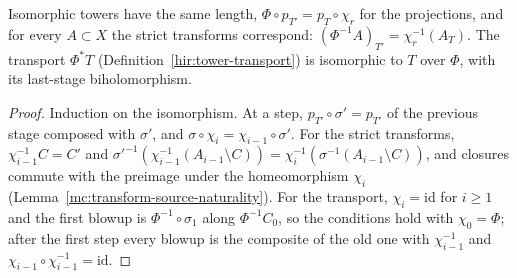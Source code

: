 \begin{lemma}
\label{mc:tower-isomorphism-basic}
\leanok
Isomorphic towers have the same length, \(\Phi\circ p_{T'}=p_T\circ\chi_r\) for the projections, and for every \(A\subset X\) the strict transforms correspond:
\((\Phi^{-1}A)_{T'}=\chi_r^{-1}(A_T)\). The transport \(\Phi^*T\) (Definition~\ref{hir:tower-transport}) is isomorphic to \(T\) over \(\Phi\), with its last-stage
biholomorphism.
\end{lemma}
\begin{proof}
\leanok
Induction on the isomorphism. At a step, \(p_{T'}\circ\sigma'=p_{T'}\) of the previous stage composed with \(\sigma'\), and \(\sigma\circ\chi_{i}=\chi_{i-1}\circ\sigma'\). For the strict
transforms, \(\chi_{i-1}^{-1}C=C'\) and \(\sigma'^{-1}(\chi_{i-1}^{-1}(A_{i-1}\setminus C))=\chi_i^{-1}(\sigma^{-1}(A_{i-1}\setminus C))\), and closures commute with the preimage
under the homeomorphism \(\chi_i\) (Lemma~\ref{mc:transform-source-naturality}). For the transport, \(\chi_i=\mathrm{id}\) for \(i\ge1\) and the first blowup is \(\Phi^{-1}\circ\sigma_1\) along
\(\Phi^{-1}C_0\), so the conditions hold with \(\chi_0=\Phi\); after the first step every blowup is the composite of the old one with \(\chi_{i-1}^{-1}\) and
\(\chi_{i-1}\circ\chi_{i-1}^{-1}=\mathrm{id}\).
\end{proof}

